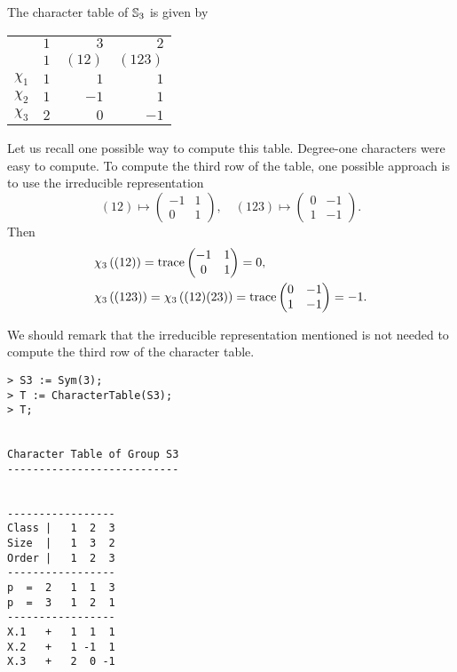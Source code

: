 \begin{example}
	The character table of $\mathbb{S}_3$ is given by 
	\begin{center}
		\begin{tabular}{|c|rrr|}
			\hline
			& $1$ & $3$ & $2$\tabularnewline
			& $1$ & $(12)$ & $(123)$ \tabularnewline
			\hline 
			$\chi_{1}$ & $1$ & $1$ & $1$\tabularnewline
			$\chi_{2}$ & $1$ & $-1$ & $1$ \tabularnewline
			$\chi_{3}$ & $2$ & $0$ & $-1$ \tabularnewline
			\hline
		\end{tabular}
	\end{center}
	Let us recall one possible way to compute this table. 
	Degree-one characters were easy to compute. 
	To compute the third row of the table, one possible approach is to use
	the irreducible representation  
	\[
	(12)\mapsto \begin{pmatrix}-1&1\\0&1\end{pmatrix},
	\quad
	(123)\mapsto \begin{pmatrix}0&-1\\1&-1\end{pmatrix}.
	\]
    Then	
    \begin{align*}
		&\chi_3\left( (12) \right)=\operatorname{trace}\begin{pmatrix}-1&1\\0&1\end{pmatrix}=0,\\
		&\chi_3\left( (123) \right)=\chi_3\left( (12)(23)\right)=\operatorname{trace}\begin{pmatrix}0&-1\\1&-1\end{pmatrix}=-1.
	\end{align*}

	We should remark that the irreducible representation 
	mentioned is not needed to
	compute the third row of the character table. 
\begin{lstlisting}
> S3 := Sym(3);
> T := CharacterTable(S3);
> T;


Character Table of Group S3
---------------------------


-----------------
Class |   1  2  3
Size  |   1  3  2
Order |   1  2  3
-----------------
p  =  2   1  1  3
p  =  3   1  2  1
-----------------
X.1   +   1  1  1
X.2   +   1 -1  1
X.3   +   2  0 -1    
\end{lstlisting}


\end{example}
